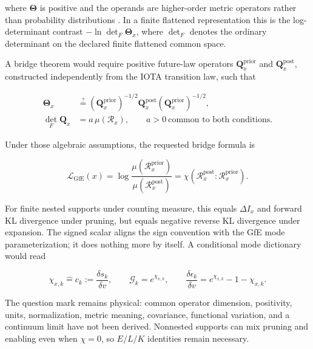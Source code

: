 where $\boldsymbol{\Theta}$ is positive and the operands are higher-order
metric operators rather than probability distributions
\cite{bianconi2025gravity,bianconi2026thermodynamics}. In a finite flattened
representation this is the log-determinant contrast
$-\ln\det_F\boldsymbol\Theta_x$, where $\det_F$ denotes the ordinary
determinant on the declared finite flattened common space.

A bridge theorem would require positive future-law operators
$\mathbf Q_x^{\mathrm{prior}}$ and $\mathbf Q_x^{\mathrm{post}}$, constructed
independently from the IOTA transition law, such that

\begin{equation}
\begin{aligned}
\boldsymbol\Theta_x
&\stackrel{?}{=}
(\mathbf Q_x^{\mathrm{prior}})^{-1/2}
\mathbf Q_x^{\mathrm{post}}
(\mathbf Q_x^{\mathrm{prior}})^{-1/2},\\
\det_F\mathbf Q_x&=a\,\mu(\mathcal R_x),
\qquad a>0\ \text{common to both conditions}.
\end{aligned}
\label{eq:iota-gfe-operator-bridge}
\end{equation}

Under those algebraic assumptions, the requested bridge formula is

\begin{equation}
\boxed{
\mathcal L_{\mathrm{GfE}}(x)
=\log\frac{\mu(\mathcal R_x^{\mathrm{prior}})}
{\mu(\mathcal R_x^{\mathrm{post}})}
=\chi(\mathcal R_x^{\mathrm{post}}\!:\!\mathcal R_x^{\mathrm{prior}})
}.
\label{eq:iota-gfe-scalar-bridge}
\end{equation}

For finite nested supports under counting measure, this equals $\Delta I_x$ and
forward KL divergence under pruning, but equals negative reverse KL divergence
under expansion. The signed scalar aligns the sign convention with the GfE mode
parameterization; it does nothing more by itself. A conditional mode dictionary
would read

\begin{equation}
\chi_{x,k}\widehat{=}c_k:=\frac{\delta s_k}{\delta v},
\qquad
\mathcal G_k=e^{\chi_{x,k}},
\qquad
\frac{\delta\epsilon_k}{\delta v}
=e^{\chi_{x,k}}-1-\chi_{x,k}.
\label{eq:gfe-conditional-crosswalk}
\end{equation}

The question mark remains physical: common operator dimension, positivity,
units, normalization, metric meaning, covariance, functional variation, and a
continuum limit have not been derived. Nonnested supports can mix pruning and
enabling even when $\chi=0$, so $E/L/K$ identities remain necessary.

